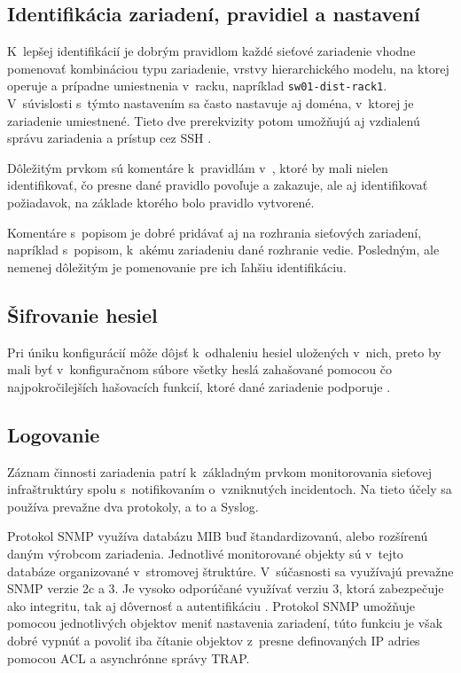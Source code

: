 \subsection*{Identifikácia zariadení, pravidiel a nastavení}
K~lepšej identifikácií je dobrým pravidlom každé sieťové zariadenie vhodne pomenovať kombináciou typu zariadenie, vrstvy hierarchického modelu, na ktorej operuje a prípadne umiestnenia v~racku, napríklad \texttt{sw01-dist-rack1}. V~súvislosti s~týmto nastavením sa často nastavuje aj doména, v~ktorej je zariadenie umiestnené. Tieto dve prerekvizity potom umožňujú aj vzdialenú správu zariadenia a prístup cez SSH \cite{CIS_DrTLsgXv24lxeIIM}.

Dôležitým prvkom sú komentáre k~pravidlám v~, ktoré by mali nielen identifikovať, čo presne dané pravidlo povoľuje a zakazuje, ale aj identifikovať požiadavok, na základe ktorého bolo pravidlo vytvorené. 

Komentáre s~popisom je dobré pridávať aj na rozhrania sieťových zariadení, napríklad s~popisom, k~akému zariadeniu dané rozhranie vedie. Posledným, ale nemenej dôležitým je pomenovanie  pre ich ľahšiu identifikáciu.

\subsection*{Šifrovanie hesiel}
Pri úniku konfigurácií môže dôjsť k~odhaleniu hesiel uložených v~nich, preto by mali byť v~konfiguračnom súbore všetky heslá zahašované pomocou čo najpokročilejších hašovacích funkcií, ktoré dané zariadenie podporuje \cite{CIS_DrTLsgXv24lxeIIM}.

\subsection*{Logovanie}
Záznam činnosti zariadenia patrí k~základným prvkom monitorovania sieťovej infraštruktúry spolu s~notifikovaním o~vzniknutých incidentoch. Na tieto účely sa používa prevažne dva protokoly, a to  a Syslog. 

Protokol SNMP využíva databázu MIB buď štandardizovanú, alebo rozšírenú daným výrobcom zariadenia. Jednotlivé monitorované objekty sú v~tejto databáze organizované v~stromovej štruktúre. V~súčasnosti sa využívajú prevažne SNMP verzie 2c a 3. Je vysoko odporúčané využívať verziu 3, ktorá zabezpečuje ako integritu, tak aj dôvernosť a autentifikáciu \cite{CIS_DrTLsgXv24lxeIIM} \cite{Graesser2001}. Protokol SNMP umožňuje pomocou jednotlivých objektov meniť nastavenia zariadení, túto funkciu je však dobré vypnúť a povoliť iba čítanie objektov z~presne definovaných IP adries pomocou ACL a asynchrónne správy TRAP.   

